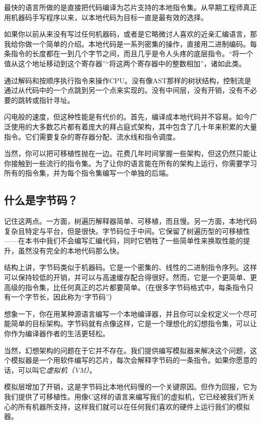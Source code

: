\documentclass[cn,11pt,chinese]{elegantbook}
\begin{document}
最快的语言所做的是直接把代码编译为芯片支持的本地指令集。从早期工程师真正用机器码手写程序以来，以本地代码为目标一直是最有效的选择。

如果你以前从来没有写过任何机器码，或者是它略微讨人喜欢的近亲汇编语言，那我给你做一个简单的介绍。本地代码是一系列密集的操作，直接用二进制编码。每条指令的长度都在一到几个字节之间，而且几乎是令人头疼的底层指令。“将一个值从这个地址移动到这个寄存器”“将这两个寄存器中的整数相加”，诸如此类。

通过解码和按顺序执行指令来操作CPU。没有像AST那样的树状结构，控制流是通过从代码中的一个点跳到另一个点来实现的。没有中间层，没有开销，没有不必要的跳转或指针寻址。

闪电般的速度，但这种性能是有代价的。首先，编译成本地代码并不容易。如今广泛使用的大多数芯片都有着庞大的拜占庭式架构，其中包含了几十年来积累的大量指令。它们需要复杂的寄存器分配、流水线和指令调度。

当然，你可以把可移植性抛在一边。花费几年时间掌握一些架构，但这仍然只能让你接触到一些流行的指令集。为了让你的语言能在所有的架构上运行，你需要学习所有的指令集，并为每个指令集编写一个单独的后端。

\subsection{什么是字节码？}

记住这两点。一方面，树遍历解释器简单、可移植，而且慢。另一方面，本地代码复杂且特定与平台，但是很快。字节码位于中间。它保留了树遍历型的可移植性——在本书中我们不会编写汇编代码，同时它牺牲了一些简单性来换取性能的提升，虽然没有完全的本地代码那么快。

结构上讲，字节码类似于机器码。它是一个密集的、线性的二进制指令序列。这样可以保持较低的开销，并可以与高速缓存配合得很好。然而，它是一个更简单、更高级的指令集，比任何真正的芯片都要简单。（在很多字节码格式中，每条指令只有一个字节长，因此称为“字节码”）

想象一下，你在用某种源语言编写一个本地编译器，并且你可以全权定义一个尽可能简单的目标架构。字节码就有点像这样，它是一个理想化的幻想指令集，可以让你作为编译器作者的生活更轻松。

当然，幻想架构的问题在于它并不存在。我们提供编写模拟器来解决这个问题，这个模拟器是一个用软件编写的芯片，每次会解释字节码的一条指令。如果你愿意的话，可以叫它\textit{虚拟机（VM）}。

模拟层增加了开销，这是字节码比本地代码慢的一个关键原因。但作为回报，它为我们提供了可移植性。用像C这样的语言来编写我们的虚拟机，它已经被我们所关心的所有机器所支持，这样我们就可以在任何我们喜欢的硬件上运行我们的模拟器。
\end{document}
